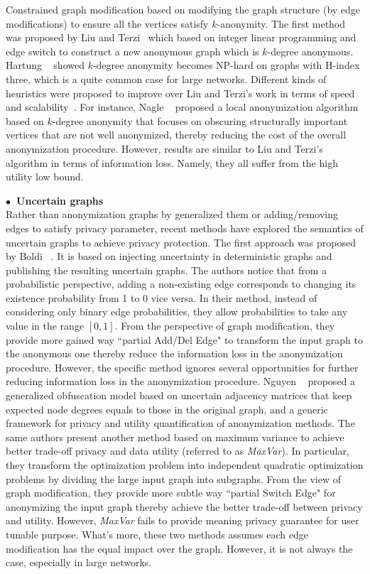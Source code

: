 Constrained graph modification based on modifying the graph structure (by edge modifications) to ensure all the vertices satisfy $k$-anonymity. The first method was proposed by Liu and Terzi~\cite{Liu_Towards_2008} which based on integer linear programming and edge switch  to construct a new anonymous graph which is $k$-degree anonymous. Hartung {\etal}~\cite{Hartung_Theory_2015} showed $k$-degree anonymity becomes NP-hard on graphs with H-index three, which is a quite common case for large networks. Different kinds of heuristics were proposed to improve over Liu and Terzi's work in terms of speed and scalability~\cite{Nagle_EWNI_2012,}. For instance, Nagle {\etal}~\cite{Nagle_EWNI_2012} proposed a local anonymization algorithm based on $k$-degree anonymity that focuses on obscuring structurally important vertices that are not well anonymized, thereby reducing the cost of the overall anonymization procedure. However, results are similar to Liu and Terzi's algorithm in terms of information loss. Namely, they all suffer from the high utility low bound. 

\hspace{-2em}\textbf{$\bullet$~Uncertain graphs}\\
Rather than anonymization graphs by generalized them or adding/removing edges to satisfy privacy parameter, recent methods have explored the semantics of uncertain graphs to achieve privacy protection. The first approach was proposed by Boldi {\etal}~\cite{Boldi_Injecting_2012}. It is based on injecting uncertainty in deterministic graphs and publishing the resulting uncertain graphs. The authors notice that from a probabilistic perspective, adding a non-existing edge corresponds to changing its existence probability from 1 to 0 vice versa. In their method, instead of considering only binary edge probabilities, they allow probabilities to take any value in the range $[0,1]$. From the perspective of graph modification, they provide more gained way ``partial Add/Del Edge" to transform the input graph to the anonymous one thereby reduce the information loss in the anonymization procedure. However, the specific method ignores several opportunities for further reducing information loss in the anonymization procedure. Nguyen {\etal}~\cite{Nguyen_Anonymizing_2015} proposed a generalized obfuscation model based on uncertain adjacency matrices that keep expected node degrees equals to those in the original graph, and a generic framework for privacy and utility quantification of anonymization methods. The same authors present another method based on maximum variance to achieve better trade-off privacy and data utility (referred to as {\em MaxVar}). In particular, they transform the optimization problem into independent quadratic optimization problems by dividing the large input graph into subgraphs. From the view of graph modification, they provide more subtle way ``partial Switch Edge" for anonymizing the input graph thereby achieve the better trade-off between privacy and utility. However, {\em MaxVar} fails to provide meaning privacy guarantee for user tunable purpose. What's more, these two methods assumes each edge modification has the equal impact over the graph. However, it is not always the case, especially in large networks. 
